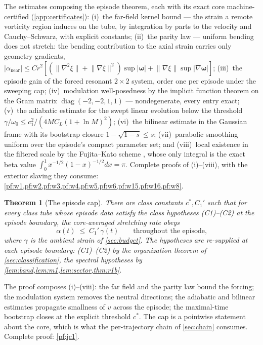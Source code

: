 \documentclass[11pt,letterpaper]{amsart}
\newtheorem{theorem}{Theorem}[section]
\theoremstyle{definition}
\theoremstyle{remark}
\newcommand{\om}{\omega}
\newcommand{\vort}{\boldsymbol{\omega}}
\newcommand{\norm}[1]{\lVert #1 \rVert}
\newcommand{\abs}[1]{\lvert #1 \rvert}
\begin{document}
The estimates composing the episode theorem, each with its exact core
machine-certified (\cref{app:certificates}): \textup{(i)}~the far-field kernel bound
--- the strain a remote vorticity region induces on the tube, by integration by parts
to the velocity and Cauchy--Schwarz, with explicit constants; \textup{(ii)}~the parity
law --- uniform bending does not stretch: the bending contribution to the axial strain
carries only geometry gradients, $\abs{\alpha_{\mathrm{near}}}\le
Cr^2[(\norm{\nabla^2\xi}+\norm{\nabla\xi}^2)\sup\abs{\vort}+\norm{\nabla\xi}\sup\abs{\nabla\vort}]$;
\textup{(iii)}~the episode gain of the forced resonant $2\times2$ system, order one
per episode under the sweeping cap; \textup{(iv)}~modulation well-posedness by the
implicit function theorem on the Gram matrix $\operatorname{diag}(-2,-2,1,1)$ ---
nondegenerate, every entry exact; \textup{(v)}~the adiabatic estimate for the swept
linear evolution below the threshold $\gamma/\om_0\le c_1^2/(4MC_L(1+\ln M)^2)$;
\textup{(vi)}~the bilinear estimate in the Gaussian frame with its bootstrap closure
$1-\sqrt{1-s}\le s$; \textup{(vii)}~parabolic smoothing uniform over the episode's
compact parameter set; and \textup{(viii)}~local existence in the filtered scale by
the Fujita--Kato scheme \cite{FujitaKato1964,Kato1984}, whose only integral is the
exact beta value $\int_0^1x^{-1/2}(1-x)^{-1/2}dx=\pi$. Complete proofs of
(i)--(viii), with the exterior slaving they consume:
\cref{pf:w1,pf:w2,pf:w3,pf:w4,pf:w5,pf:w6,pf:w15,pf:w16,pf:w8}.

\begin{theorem}[The episode cap]\label{thm:jc1}
There are class constants $c^*, C_1'$ such that for every class tube whose episode
data satisfy the class hypotheses \textup{(C1)--(C2)} at the episode boundary, the
core-averaged stretching rate obeys
\[
\alpha(t)\;\le\;C_1'\,\gamma(t)\qquad\text{throughout the episode,}
\]
where $\gamma$ is the ambient strain of \cref{sec:budget}. The hypotheses are
re-supplied at each episode boundary: \textup{(C1)--(C2)} by the organization theorem
of \cref{sec:classification}, the spectral hypotheses by
\cref{lem:band,lem:m1,lem:sector,thm:r1b}.
\end{theorem}

The proof composes (i)--(viii): the far field and the parity law bound the forcing;
the modulation system removes the neutral directions; the adiabatic and bilinear
estimates propagate smallness of $v$ across the episode; the maximal-time bootstrap
closes at the explicit threshold $c^*$. The cap is a pointwise statement about the
core, which is what the per-trajectory chain of \cref{sec:chain} consumes. Complete
proof: \cref{pf:jc1}.
\end{document}

